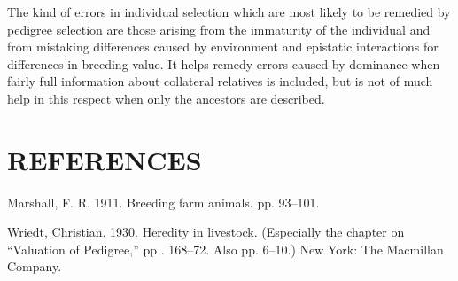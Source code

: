 The kind of errors in individual selection which are most likely to
be remedied by pedigree selection are those arising from the immaturity
of the individual and from mistaking differences caused by environment
and epistatic interactions for differences in breeding value. It
helps remedy errors caused by dominance when fairly full information
about collateral relatives is included, but is not of much help in this
respect when only the ancestors are described.

\section*{REFERENCES}

\begin{hangparas}{0.5in}{1}%
Marshall, F. R. 1911. Breeding farm animals. pp. 93--101.

Wriedt, Christian. 1930. Heredity in livestock. (Especially the chapter on ``Valuation
of Pedigree,'' pp . 168--72. Also pp. 6--10.) New York: The Macmillan
Company.
\end{hangparas}

